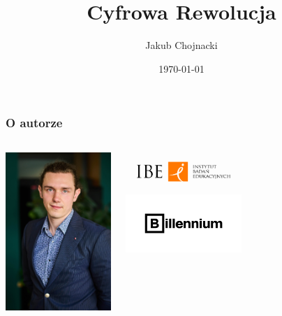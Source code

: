 \documentclass[smaller]{beamer}
\title{Cyfrowa Rewolucja}
\author{Jakub Chojnacki}
\date{\today}
\begin{document}
\frame{\titlepage}

\begin{frame}
\frametitle{O autorze}
\begin{columns}
    \begin{column}{0.3\textwidth}
        \includegraphics[width=\textwidth]{../manifest/jakub-chojnacki-billennium.jpg} 
    \end{column}
    \begin{column}{0.7\textwidth}
        \includegraphics[width=0.5\textwidth]{../manifest/logo-ibe.png} 
        \includegraphics[width=0.5\textwidth]{../manifest/logo-billennium.png}
    \end{column}
\end{columns}
\end{frame}
\end{document}
